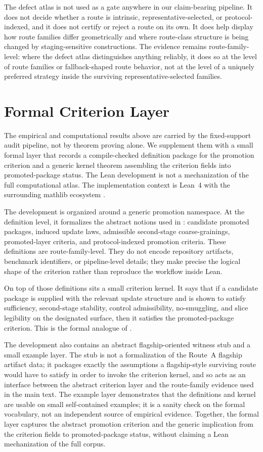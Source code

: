 \documentclass[11pt]{article}
\theoremstyle{definition}
\begin{document}
The defect atlas is not used as a gate anywhere in our claim-bearing pipeline. It does not decide whether a route is intrinsic, representative-selected, or protocol-indexed, and it does not certify or reject a route on its own. It does help display how route families differ geometrically and where route-class structure is being changed by staging-sensitive constructions. The evidence remains route-family-level: where the defect atlas distinguishes anything reliably, it does so at the level of route families or fallback-shaped route behavior, not at the level of a uniquely preferred strategy inside the surviving representative-selected families.
 \section{Formal Criterion Layer}\label{sec:formal}

The empirical and computational results above are carried by the fixed-support audit pipeline, not by theorem proving alone. We supplement them with a small formal layer that records a compile-checked definition package for the promotion criterion and a generic kernel theorem assembling the criterion fields into promoted-package status. The Lean development is not a mechanization of the full computational atlas. The implementation context is Lean~4 with the surrounding mathlib ecosystem \citep{deMouraUllrich2021,Mathlib2020}.

The development is organized around a generic promotion namespace. At the definition level, it formalizes the abstract notions used in : candidate promoted packages, induced update laws, admissible second-stage coarse-grainings, promoted-layer criteria, and protocol-indexed promotion criteria. These definitions are route-family-level. They do not encode repository artifacts, benchmark identifiers, or pipeline-level details; they make precise the logical shape of the criterion rather than reproduce the workflow inside Lean.

On top of those definitions sits a small criterion kernel. It says that if a candidate package is supplied with the relevant update structure and is shown to satisfy sufficiency, second-stage stability, control admissibility, no-smuggling, and slice legibility on the designated surface, then it satisfies the promoted-package criterion. This is the formal analogue of .

The development also contains an abstract flagship-oriented witness stub and a small example layer. The stub is not a formalization of the Route~A flagship artifact data; it packages exactly the assumptions a flagship-style surviving route would have to satisfy in order to invoke the criterion kernel, and so acts as an interface between the abstract criterion layer and the route-family evidence used in the main text. The example layer demonstrates that the definitions and kernel are usable on small self-contained examples; it is a sanity check on the formal vocabulary, not an independent source of empirical evidence. Together, the formal layer captures the abstract promotion criterion and the generic implication from the criterion fields to promoted-package status, without claiming a Lean mechanization of the full corpus.
\end{document}
